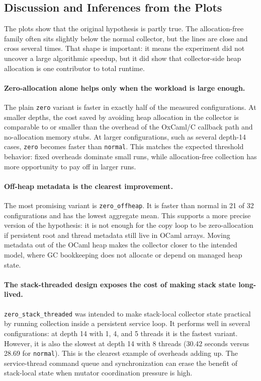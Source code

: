 \documentclass[11pt,a4paper]{article}
\begin{document}
\subsection{Discussion and Inferences from the Plots}

The plots show that the original hypothesis is partly true. The
allocation-free family often sits slightly below the normal collector, but the
lines are close and cross several times. That shape is important: it means the
experiment did not uncover a large algorithmic speedup, but it did show that
collector-side heap allocation is one contributor to total runtime.

\paragraph{Zero-allocation alone helps only when the workload is large enough.}
The plain \texttt{zero} variant is faster in exactly half of the measured
configurations. At smaller depths, the cost saved by avoiding heap allocation in
the collector is comparable to or smaller than the overhead of the OxCaml/C
callback path and no-allocation memory stubs. At larger configurations, such as
several depth-14 cases, \texttt{zero} becomes faster than \texttt{normal}. This
matches the expected threshold behavior: fixed overheads dominate small runs,
while allocation-free collection has more opportunity to pay off in larger
runs.

\paragraph{Off-heap metadata is the clearest improvement.}
The most promising variant is \texttt{zero\_offheap}. It is faster than normal
in 21 of 32 configurations and has the lowest aggregate mean. This supports a
more precise version of the hypothesis: it is not enough for the copy loop to be
zero-allocation if persistent root and thread metadata still live in OCaml
arrays. Moving metadata out of the OCaml heap makes the collector closer to the
intended model, where GC bookkeeping does not allocate or depend on managed heap
state.

\paragraph{The stack-threaded design exposes the cost of making stack state
long-lived.}
\texttt{zero\_stack\_threaded} was intended to make stack-local collector state
practical by running collection inside a persistent service loop. It performs
well in several configurations: at depth 14 with 1, 4, and 5 threads it is the
fastest variant. However, it is also the slowest at depth 14 with 8 threads
(30.42 seconds versus 28.69 for \texttt{normal}). This is the clearest example
of overheads adding up. The service-thread command queue and synchronization
can erase the benefit of stack-local state when mutator coordination pressure is
high.
\end{document}

